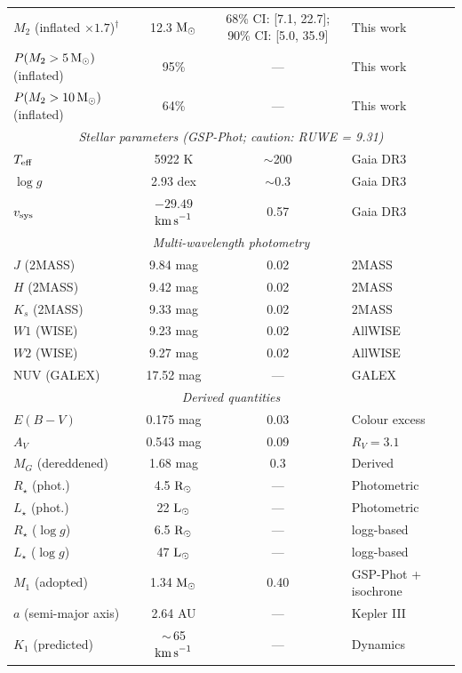 \documentclass[usenatbib,fleqn]{mnras}
\newcommand{\Msun}{{\rm M}_\odot}
\newcommand{\Lsun}{{\rm L}_\odot}
\newcommand{\Rsun}{{\rm R}_\odot}
\newcommand{\kms}{{\rm km\,s}^{-1}}
\begin{document}
\begin{table}
\begin{tabular}{lccl}
$M_2$ (inflated $\times 1.7$)$^\dagger$ & 12.3 $\Msun$ & 68\% CI: [7.1, 22.7]; 90\% CI: [5.0, 35.9] & This work \\
$P(M_2 > 5\,\Msun)$ (inflated) & 95\%    & ---      & This work \\
$P(M_2 > 10\,\Msun)$ (inflated) & 64\%   & ---      & This work \\
\midrule
\multicolumn{4}{c}{\textit{Stellar parameters (GSP-Phot; caution: RUWE = 9.31)}} \\
$T_{\rm eff}$          & 5922 K              & $\sim$200 & Gaia DR3 \\
$\log g$               & 2.93 dex            & $\sim$0.3 & Gaia DR3 \\
$v_{\rm sys}$          & $-29.49$ $\kms$     & 0.57     & Gaia DR3 \\
\midrule
\multicolumn{4}{c}{\textit{Multi-wavelength photometry}} \\
$J$ (2MASS)            & 9.84 mag            & 0.02     & 2MASS \\
$H$ (2MASS)            & 9.42 mag            & 0.02     & 2MASS \\
$K_s$ (2MASS)          & 9.33 mag            & 0.02     & 2MASS \\
$W1$ (WISE)            & 9.23 mag            & 0.02     & AllWISE \\
$W2$ (WISE)            & 9.27 mag            & 0.02     & AllWISE \\
NUV (GALEX)            & 17.52 mag           & ---      & GALEX \\
\midrule
\multicolumn{4}{c}{\textit{Derived quantities}} \\
$E(B-V)$               & 0.175 mag           & 0.03     & Colour excess \\
$A_V$                  & 0.543 mag           & 0.09     & $R_V = 3.1$ \\
$M_G$ (dereddened)     & 1.68 mag            & 0.3      & Derived \\
$R_\star$ (phot.)      & 4.5 $\Rsun$         & ---      & Photometric \\
$L_\star$ (phot.)      & 22 $\Lsun$          & ---      & Photometric \\
$R_\star$ ($\log g$)   & 6.5 $\Rsun$         & ---      & logg-based \\
$L_\star$ ($\log g$)   & 47 $\Lsun$          & ---      & logg-based \\
$M_1$ (adopted)        & 1.34 $\Msun$        & 0.40     & GSP-Phot + isochrone \\
$a$ (semi-major axis)  & 2.64 AU             & ---      & Kepler III \\
$K_1$ (predicted)      & $\sim$\,65 $\kms$   & ---      & Dynamics \\
\bottomrule
\end{tabular}
\end{table}
\end{document}
